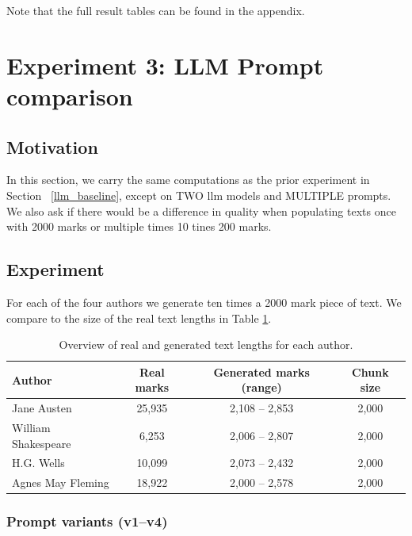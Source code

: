 \documentclass{article}
\begin{document}
Note that the full result tables can be found in the appendix.

\section{Experiment 3: LLM Prompt comparison}\label{llm_prompt}

\subsection{Motivation}
In this section, we carry the same computations as the prior experiment in Section ~\ref{llm_baseline}, except on TWO llm models and MULTIPLE prompts. We also ask if there would be a difference in quality when populating texts once with 2000 marks or multiple times 10 tines 200 marks.

\subsection{Experiment}

For each of the four authors we generate ten times a 2000 mark piece of text. We compare to the size of the real text lengths in Table \ref{tab:setup}.

\begin{table}[htbp]
\centering
\begin{tabular}{lccc}
\toprule
Author & Real marks & Generated marks (range) & Chunk size \\
\midrule
Jane Austen & 25,935 & 2,108 -- 2,853 & 2,000 \\
William Shakespeare & 6,253 & 2,006 -- 2,807 & 2,000 \\
H.G. Wells & 10,099 & 2,073 -- 2,432 & 2,000 \\
Agnes May Fleming & 18,922 & 2,000 -- 2,578 & 2,000 \\
\bottomrule
\end{tabular}
\caption{Overview of real and generated text lengths for each author.}
\label{tab:setup}
\end{table}

\subsubsection{Prompt variants (v1--v4)}
\label{subsec:prompt_variants}
\end{document}
